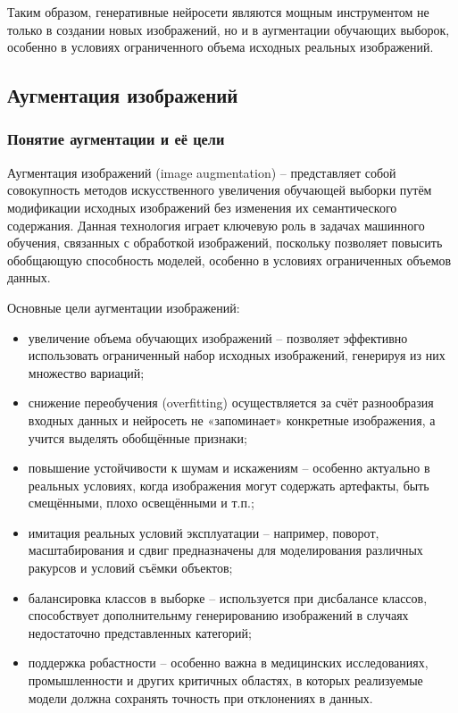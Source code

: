 Таким образом, генеративные нейросети являются мощным инструментом не только в создании новых изображений, но и в аугментации обучающих выборок, особенно в условиях ограниченного объема исходных реальных изображений.

\subsection{Аугментация изображений}
\subsubsection{Понятие аугментации и её цели}

Аугментация изображений (image augmentation) – представляет собой совокупность методов искусственного увеличения обучающей выборки путём модификации исходных изображений без изменения их семантического содержания. Данная технология играет ключевую роль в задачах машинного обучения, связанных с обработкой изображений, поскольку позволяет повысить обобщающую способность моделей, особенно в условиях ограниченных объемов данных.

Основные цели аугментации изображений:

\begin{itemize}
	\item увеличение объема обучающих изображений – позволяет эффективно использовать ограниченный набор исходных изображений, генерируя из них множество вариаций;
	\item снижение переобучения (overfitting) осуществляется за счёт разнообразия входных данных и нейросеть не «запоминает» конкретные изображения, а учится выделять обобщённые признаки;
	\item повышение устойчивости к шумам и искажениям – особенно актуально в реальных условиях, когда изображения могут содержать артефакты, быть смещёнными, плохо освещёнными и т.п.;
	\item имитация реальных условий эксплуатации – например, поворот, масштабирования и сдвиг предназначены для моделирования различных ракурсов и условий съёмки объектов;
	\item балансировка классов в выборке – используется при дисбалансе классов, способствует дополнительнму генерированию изображений в случаях недостаточно представленных категорий;
	\item поддержка робастности – особенно важна в медицинских исследованиях, промышленности и других критичных областях, в которых реализуемые модели должна сохранять точность при отклонениях в данных.
\end{itemize}

